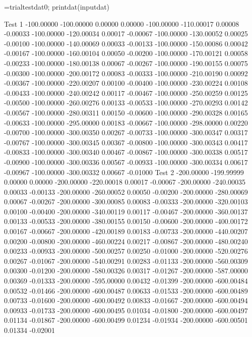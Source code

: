 \documentclass{article}
\begin{document}
\begin{matlabcode}
=trialtestdat0;
printdat(inputdat)
\end{matlabcode}
\begin{matlaboutput}
             Test 1
-100.00000  -100.00000   0.00000    0.00000
-100.00000  -110.00017   0.00008   -0.00033
-100.00000  -120.00034   0.00017   -0.00067
-100.00000  -130.00052   0.00025   -0.00100
-100.00000  -140.00069   0.00033   -0.00133
-100.00000  -150.00086   0.00042   -0.00167
-100.00000  -160.00104   0.00050   -0.00200
-100.00000  -170.00121   0.00058   -0.00233
-100.00000  -180.00138   0.00067   -0.00267
-100.00000  -190.00155   0.00075   -0.00300
-100.00000  -200.00172   0.00083   -0.00333
-100.00000  -210.00190   0.00092   -0.00367
-100.00000  -220.00207   0.00100   -0.00400
-100.00000  -230.00224   0.00108   -0.00433
-100.00000  -240.00242   0.00117   -0.00467
-100.00000  -250.00259   0.00125   -0.00500
-100.00000  -260.00276   0.00133   -0.00533
-100.00000  -270.00293   0.00142   -0.00567
-100.00000  -280.00311   0.00150   -0.00600
-100.00000  -290.00328   0.00165   -0.00633
-100.00000  -295.00000   0.00183   -0.00667
-100.00000  -298.00000   0.00220   -0.00700
-100.00000  -300.00350   0.00267   -0.00733
-100.00000  -300.00347   0.00317   -0.00767
-100.00000  -300.00345   0.00367   -0.00800
-100.00000  -300.00343   0.00417   -0.00833
-100.00000  -300.00340   0.00467   -0.00867
-100.00000  -300.00338   0.00517   -0.00900
-100.00000  -300.00336   0.00567   -0.00933
-100.00000  -300.00334   0.00617   -0.00967
-100.00000  -300.00332   0.00667   -0.01000
             Test 2
-200.00000  -199.99999   0.00000    0.00000
-200.00000  -220.00018   0.00017   -0.00067
-200.00000  -240.00035   0.00033   -0.00133
-200.00000  -260.00052   0.00050   -0.00200
-200.00000  -280.00069   0.00067   -0.00267
-200.00000  -300.00085   0.00083   -0.00333
-200.00000  -320.00103   0.00100   -0.00400
-200.00000  -340.00119   0.00117   -0.00467
-200.00000  -360.00137   0.00133   -0.00533
-200.00000  -380.00155   0.00150   -0.00600
-200.00000  -400.00172   0.00167   -0.00667
-200.00000  -420.00189   0.00183   -0.00733
-200.00000  -440.00207   0.00200   -0.00800
-200.00000  -460.00224   0.00217   -0.00867
-200.00000  -480.00240   0.00233   -0.00933
-200.00000  -500.00257   0.00250   -0.01000
-200.00000  -520.00276   0.00267   -0.01067
-200.00000  -540.00291   0.00283   -0.01133
-200.00000  -560.00309   0.00300   -0.01200
-200.00000  -580.00326   0.00317   -0.01267
-200.00000  -587.00000   0.00369   -0.01333
-200.00000  -595.00000   0.00432   -0.01399
-200.00000  -600.00484   0.00532   -0.01466
-200.00000  -600.00487   0.00633   -0.01533
-200.00000  -600.00489   0.00733   -0.01600
-200.00000  -600.00492   0.00833   -0.01667
-200.00000  -600.00494   0.00933   -0.01733
-200.00000  -600.00495   0.01034   -0.01800
-200.00000  -600.00497   0.01134   -0.01867
-200.00000  -600.00499   0.01234   -0.01934
-200.00000  -600.00501   0.01334   -0.02001
\end{matlaboutput}
\end{document}
